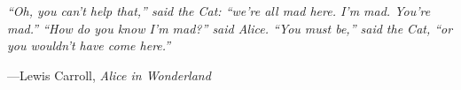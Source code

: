 \setlength{}
\setlength\epigraphrule{0pt}

\vspace*{\fill}
\epigraph{\justifying \itshape ``Oh, you can't help that,'' said the Cat: ``we're all mad here. I'm mad. You're mad.'' ``How do you know I'm mad?'' said Alice. ``You must be,'' said the Cat, ``or you wouldn't have come here.''}{---Lewis Carroll, \textit{Alice in Wonderland}}
